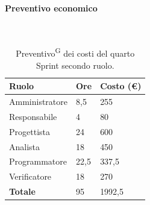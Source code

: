 \documentclass[8pt]{article}
\newcommand{\glossterm}[1]{#1\textsuperscript{G}} %
\newcommand{\subsubsubsection}[1]{\paragraph{#1}\mbox{}\\}
\begin{document}
\subsubsubsection{Preventivo economico}
\begin{table}[ht!]
	\centering
	\begin{tabular}{p{4cm} p{1cm} p{2cm}}
        \toprule
        \textbf{Ruolo} & \textbf{Ore} & \textbf{Costo (€)} \\
        \midrule
        Amministratore & 8,5 & 255 \\
        Responsabile & 4 & 80 \\
        Progettista & 24 & 600 \\
        Analista & 18 & 450 \\
        Programmatore & 22,5 & 337,5 \\
        Verificatore & 18 & 270 \\
        \midrule
        \textbf{Totale} & 95 & 1992,5 \\
        \bottomrule
    \end{tabular}
    \caption{\glossterm{Preventivo} dei costi del quarto Sprint secondo ruolo.}
	\label{table:Preventivo dei costi del quarto Sprint secondo ruolo}
\end{table}
\end{document}

